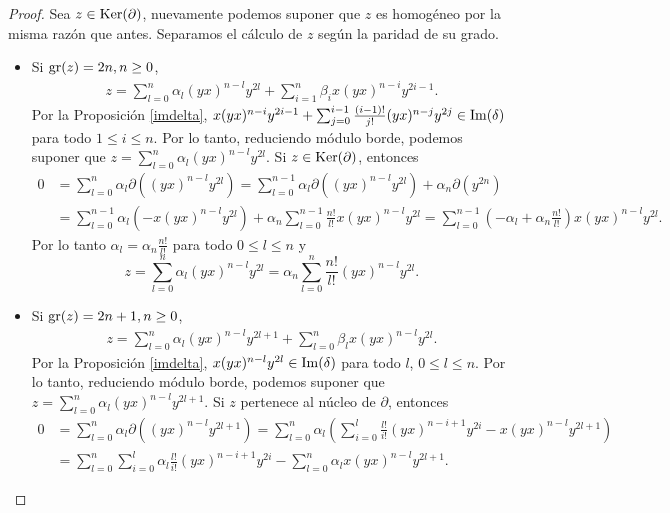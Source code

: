 \documentclass[fleqn,../tesis.tex]{subfiles}
\begin{document}
\begin{proof}
	Sea $z \in \operatorname{Ker}(\partial)$, nuevamente podemos suponer que $z$ es homogéneo por la misma razón que antes.
	Separamos el cálculo de $z$ según la paridad de su grado.
	\begin{itemize}
		\item Si $\operatorname{gr}(z) = 2n, n \geq 0$,
		\begin{align*}
			z = \sum_{l = 0}^n\alpha_l(yx)^{n - l}y^{2l} + \sum_{i = 1}^n\beta_ix(yx)^{n - i}y^{2i - 1}.
		\end{align*}
		Por la Proposición \ref{imdelta}, $x(yx)^{n - i}y^{2i - 1} + \sum_{j = 0}^{i - 1}\frac{(i-1)!}{j!}(yx)^{n - j}y^{2j} \in \operatorname{Im}(\delta)$
		para todo $1 \leq i \leq n$.
		Por lo tanto, reduciendo módulo borde, podemos suponer que $z = \sum_{l = 0}^n\alpha_l(yx)^{n - l}y^{2l}$.
		Si $z \in \operatorname{Ker}(\partial)$, entonces
		\begin{align*}
			0 &= \sum_{l = 0}^n\alpha_l\partial((yx)^{n - l}y^{2l})
				= \sum_{l = 0}^{n - 1}\alpha_l\partial((yx)^{n - l}y^{2l}) + \alpha_n\partial(y^{2n})\\
			&= \sum_{l = 0}^{n - 1}\alpha_l(-x(yx)^{n - l}y^{2l}) + \alpha_n\sum_{l = 0}^{n - 1}\frac{n!}{l!}x(yx)^{n - l}y^{2l}
				= \sum_{l = 0}^{n - 1}(-\alpha_l + \alpha_n\frac{n!}{l!})x(yx)^{n - l}y^{2l}.
		\end{align*}
		Por lo tanto $\alpha_l = \alpha_n\frac{n!}{l!}$ para todo $0 \leq l \leq n$ y
		\[
			z = 	\sum_{l = 0}^n\alpha_l(yx)^{n - l}y^{2l} = \alpha_n\sum_{l = 0}^n\frac{n!}{l!}(yx)^{n - l}y^{2l}.
		\]
		\item Si $\operatorname{gr}(z) = 2n + 1, n \geq 0$,
		\begin{align*}
			z = \sum_{l = 0}^n\alpha_l(yx)^{n - l}y^{2l + 1} + \sum_{l = 0}^n\beta_lx(yx)^{n - l}y^{2l}.
		\end{align*}
		Por la Proposición \ref{imdelta}, $x(yx)^{n - l}y^{2l} \in \operatorname{Im}(\delta)$ para todo $l$, $0 \leq l \leq n$.
		Por lo tanto, reduciendo módulo borde, podemos suponer que $z = \sum_{l = 0}^n\alpha_l(yx)^{n - l}y^{2l + 1}$.
		Si $z$ pertenece al núcleo de $\partial$, entonces
		\begin{align*}
			0 &= \sum_{l = 0}^n\alpha_l\partial((yx)^{n - l}y^{2l + 1})
				= \sum_{l = 0}^n\alpha_l\left(\sum_{i = 0}^l\frac{l!}{i!}(yx)^{n - i + 1}y^{2i} -x(yx)^{n - l}y^{2l + 1}\right)\\
			&= \sum_{l = 0}^n\sum_{i = 0}^l\alpha_l\frac{l!}{i!}(yx)^{n - i + 1}y^{2i} - \sum_{l = 0}^n\alpha_lx(yx)^{n - l}y^{2l + 1}.
		\end{align*}

\end{itemize}
\end{proof}
\end{document}

